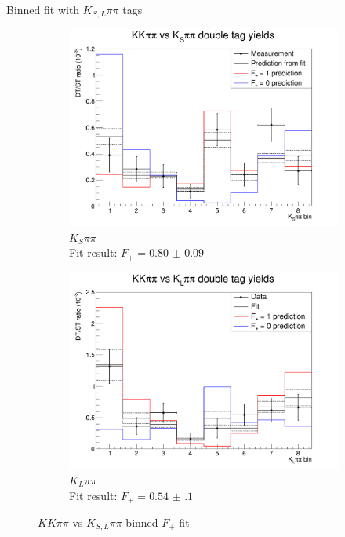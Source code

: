 \documentclass{beamer}
\begin{document}
\begin{frame}{Binned fit with $K_{S, L}\pi\pi$ tags}
  \begin{figure}
    \centering
    \vspace{-0.2cm}
    \begin{subfigure}{0.50\textwidth}
      \includegraphics[width = 1.0\textwidth]{Plots/CPeven_fraction_combination_KSpipi.png}
      \caption{$K_S\pi\pi$\\Fit result: $F_+ = \SI{0.80(9)}{}$}
    \end{subfigure}%
    \begin{subfigure}{0.50\textwidth}
      \includegraphics[width = 1.0\textwidth]{Plots/CPeven_fraction_combination_KLpipi.png}
      \caption{$K_L\pi\pi$\\Fit result: $F_+ = \SI{0.54(10)}{}$}
    \end{subfigure}
    \caption{$KK\pi\pi$ vs $K_{S, L}\pi\pi$ binned $F_+$ fit}
  \end{figure}
\end{frame}
\end{document}
